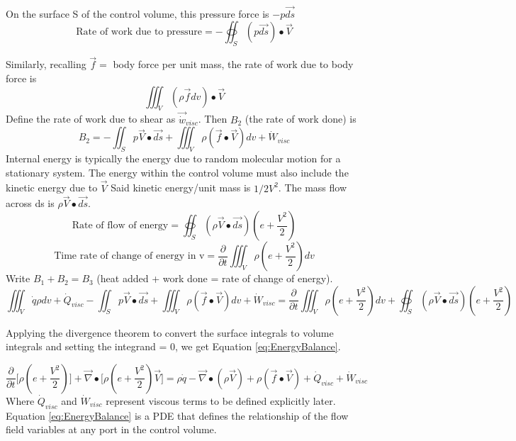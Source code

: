 \documentclass[draft=false, titlepage]{article}
\newcommand{\gradient}{\vec{\nabla}}
\newcommand{\deldelt}{\frac{\partial}{\partial t}}
\newcommand{\volumeint}{\iiint_V}
\begin{document}
\paragraph{} On the surface S of the control volume, this pressure force is $-p\vec{ds}$
\begin{equation*}
    \text{Rate of work due to pressure} = -\oiint_S(p\vec{ds})\bullet\vec{V}
\end{equation*}

Similarly, recalling $\vec{f} =$ body force per unit mass, the rate of work due to body force is
\begin{equation*}
    \volumeint (\rho\vec{f} dv)\bullet \vec{V}
\end{equation*}
Define the rate of work due to shear as $\vec{\dot{w}}_{visc}$. Then $B_2$ (the rate of work done) is 
\begin{equation*}
    B_2 = -\iint_S p\vec{V}\bullet \vec{ds} + \volumeint \rho(\vec{f}\bullet\vec{V})dv + \dot{W}_{visc}
\end{equation*}
Internal energy is typically the energy due to random molecular motion for a stationary system. The energy within the control volume must also include the kinetic energy due to $\vec{V}$ Said kinetic energy/unit mass is $1/2V^2$. The mass flow across ds is $\rho \vec{V} \bullet \vec{ds}$.
\begin{equation*}
    \text{Rate of flow of energy} = \oiint_S (\rho \vec{V}\bullet \vec{ds})(e+\frac{V^2}{2})
\end{equation*}
\begin{equation*}
    \text{Time rate of change of energy in v} = \deldelt \volumeint \rho (e+\frac{V^2}{2})dv
\end{equation*}
Write $B_1 + B_2 = B_3$ (heat added + work done = rate of change of energy).
\begin{equation*}
    \volumeint \dot{q} \rho dv + \dot{Q}_{visc}
    -\iint_S p\vec{V}\bullet \vec{ds} + \volumeint \rho(\vec{f}\bullet\vec{V})dv + \dot{W}_{visc}
    = \deldelt \volumeint \rho(e+\frac{V^2}{2}) dv + \oiint_S (\rho \vec{V}\bullet \vec{ds})(e+\frac{V^2}{2})
\end{equation*}

Applying the divergence theorem to convert the surface integrals to volume integrals and setting the integrand = 0, we get Equation \ref{eq:EnergyBalance}.

\begin{equation}
    \deldelt \Big[ \rho(e+\frac{V^2}{2}) \Big] + \gradient \bullet \Big[ \rho(e+\frac{V^2}{2})\vec{V} \Big] =
    \rho \dot{q} - \gradient\bullet(\rho\vec{V}) + \rho (\vec{f}\bullet \vec{V}) + \dot{Q}_{visc} + \dot{W}_{visc}
    \label{eq:EnergyBalance}
\end{equation}
Where $\dot{Q}_{visc}$ and $\dot{W}_{visc}$ represent viscous terms to be defined explicitly later. Equation \ref{eq:EnergyBalance} is a PDE that defines the relationship of the flow field variables at any port in the control volume.
\end{document}
